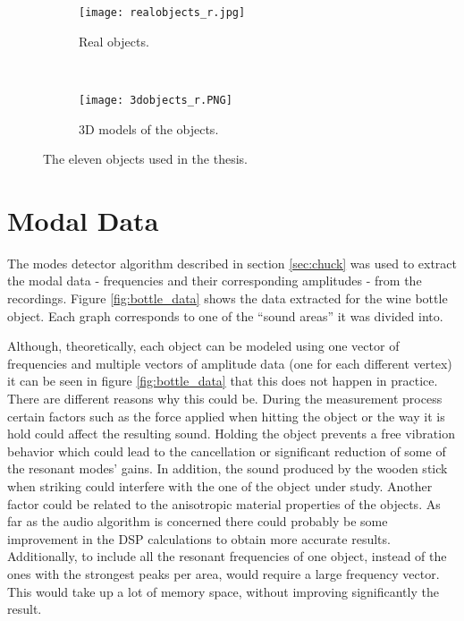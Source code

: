 \begin{figure}[H]
    \centering
    \begin{subfigure}[b]{0.8\textwidth}
        \texttt{[image: realobjects\_r.jpg]}
        \caption{Real objects.}
        \label{fig:real}
    \end{subfigure}
    ~ %
    \begin{subfigure}[b]{0.8\textwidth}
        \texttt{[image: 3dobjects\_r.PNG]}
        \caption{3D models of the objects.}
        \label{fig:models}
    \end{subfigure}
    \caption{The eleven objects used in the thesis.}\label{fig:objects}
\end{figure}

\section{Modal Data}
The modes detector algorithm described in section \ref{sec:chuck} was used to extract the modal data - frequencies and their corresponding amplitudes - from the recordings. Figure \ref{fig:bottle_data} shows the data extracted for the wine bottle object. Each graph corresponds to one of the ``sound areas'' it was divided into.


Although, theoretically, each object can be modeled using one vector of frequencies and multiple vectors of amplitude data (one for each different vertex) it can be seen in figure \ref{fig:bottle_data} that this does not happen in practice. There are different reasons why this could be. During the measurement process certain factors such as the force applied when hitting the object or the way it is hold could affect the resulting sound. Holding the object prevents a free vibration behavior which could lead to the cancellation or significant reduction of some of the resonant modes' gains. In addition, the sound produced by the wooden stick when striking could interfere with the one of the object under study. Another factor could be related to the anisotropic material properties of the objects. As far as the audio algorithm is concerned there could probably be some improvement in the \gls{DSP} calculations to obtain more accurate results. Additionally, to include all the resonant frequencies of one object, instead of the ones with the strongest peaks per area, would require a large frequency vector. This would take up a lot of memory space, without improving significantly the result.


